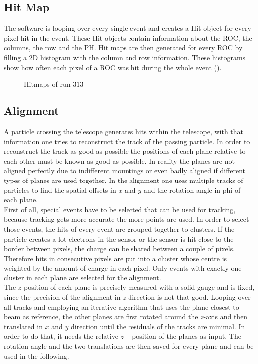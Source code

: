 \subsection{Hit Map}
The software is looping over every single event and creates a Hit object for every pixel hit in the event. These Hit objects contain information about the \ac{ROC}, the columns, the row and the \ac{PH}. Hit maps are then generated for every \ac{ROC} by filling a 2D histogram with the column and row information. These histograms show how often each pixel of a \ac{ROC} was hit during the whole event ().
\begin{figure}[ht]
	\centering
	\hfill
	\caption{Hitmaps of run $313$}
	\label{phitmap}
\end{figure}\no
\subsection{Alignment}
A particle crossing the telescope generates hits within the telescope, with that information one tries to reconstruct the track of the passing particle. In order to reconstruct the track as good as possible the positions of each plane relative to each other must be known as good as possible. In reality the planes are not aligned perfectly due to indifferent mountings or even badly aligned if different types of planes are used together. In the alignment one uses multiple tracks of particles to find the spatial offsets in $x$ and $y$ and the rotation angle in phi of each plane.\\
First of all, special events have to be selected that can be used for tracking, because tracking gets more accurate the more points are used. In order to select those events, the hits of every event are grouped together to clusters. If the particle creates a lot electrons in the sensor or the sensor is hit close to the border between pixels, the charge can be shared between a couple of pixels. Therefore hits in consecutive pixels are put into a cluster whose centre is weighted by the amount of charge in each pixel. Only events with exactly one cluster in each plane are selected for the alignment.\\
The $z$ position of each plane is precisely measured with a solid gauge and is fixed, since the precision of the alignment in $z$ direction is not that good. Looping over all tracks and employing an iterative algorithm that uses the plane closest to beam as reference, the other planes are first rotated around the $z$-axis and then translated in $x$ and $y$ direction until the residuals of the tracks are minimal. In order to do that, it needs the relative $z-$position of the planes as input. The rotation angle and the two translations are then saved for every plane and can be used in the following. 
